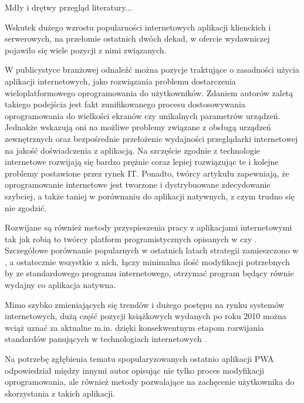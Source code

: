Mdły i drętwy przegląd literatury...

Wskutek dużego wzrostu popularności internetowych aplikacji klienckich i serwerowych, na przełomie ostatnich dwóch dekad, w ofercie wydawniczej pojawiło się wiele pozycji z nimi związanych. 

W publicystyce branżowej odnaleźć można pozycje traktujące o zasadności użycia aplikacji internetowych, jako rozwiązania problemu dostarczenia wieloplatformowego oprogramowania do użytkowników. Zdaniem autorów \cite{Latif2016} zaletą takiego podejścia jest fakt zunifikowanego procesu dostosowywania oprogramowania do wielkości ekranów czy unikalnych parametrów urządzeń. Jednakże wskazują oni na możliwe problemy związane z obsługą urządzeń zewnętrznych oraz bezpośrednie przełożenie wydajności przeglądarki internetowej na jakość doświadczenia z aplikacją. Na szczęście zgodnie z \cite{SmeetsRuben2016TiWB} technologie internetowe rozwijają się bardzo prężnie coraz lepiej rozwiązując te i kolejne problemy postawione przez rynek IT. Ponadto, twórcy artykułu \cite{Charland2011} zapewniają, że oprogramowanie internetowe jest tworzone i dystrybuowane zdecydowanie szybciej, a także taniej w porównaniu do aplikacji natywnych, z czym trudno się nie zgodzić. 

Rozwijane są również metody przyspieszenia pracy z aplikacjami internetowymi tak jak robią to twórcy platform programistycznych opisanych w \cite{ReactNative} czy \cite{NativeScript}. Szczegółowe porównanie popularnych w ostatnich latach strategii zamieszczono w \cite{Biørn-Hansen2017}, a ostatecznie wszystkie z nich, łączy minimalna ilość modyfikacji potrzebnych by ze standardowego programu internetowego, otrzymać program będący równie wydajny co aplikacja natywna.

Mimo szybko zmieniających się trendów i dużego postępu na rynku systemów internetowych, dużą część pozycji książkowych wydanych po roku 2010 można wciąż uznać za aktualne m.in. dzięki konsekwentnym etapom rozwijania standardów panujących w technologiach internetowych \cite{W3C}.

Na potrzebę zgłębienia tematu spopularyzowanych ostatnio aplikacji PWA odpowiedział między innymi autor \cite{Tal2017} opisując nie tylko proces modyfikacji oprogramowania, ale również metody pozwalające  na zachęcenie użytkownika do skorzystania z  takich aplikacji.

